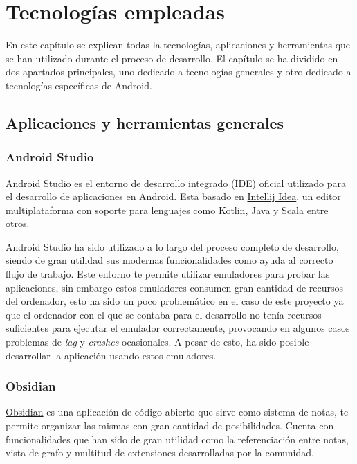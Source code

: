 \chapter{Tecnologías empleadas}
\label{cap:tecnologiasEmpleadas}
En este capítulo se explican todas la tecnologías, aplicaciones y herramientas que se han utilizado durante el proceso de desarrollo. El capítulo se ha dividido en dos apartados principales, uno dedicado a tecnologías generales y otro dedicado a tecnologías específicas de Android.

\section{Aplicaciones y herramientas generales}
\hypertarget{subsec:android_studio}{}
\subsection{Android Studio}
\href{https://developer.android.com/studio/intro}{Android Studio} es el entorno de desarrollo integrado (IDE) oficial utilizado para el desarrollo de aplicaciones en Android. Esta basado en \href{https://www.jetbrains.com/idea}{Intellij Idea}, un editor multiplataforma con soporte para lenguajes como \hyperlink{subsec:kotlin}{Kotlin}, \href{https://www.java.com}{Java} y \href{https://www.scala-lang.org}{Scala} entre otros. 

Android Studio ha sido utilizado a lo largo del proceso completo de desarrollo, siendo de gran utilidad sus modernas funcionalidades como ayuda al correcto flujo de trabajo. Este entorno te permite utilizar emuladores para probar las aplicaciones, sin embargo estos emuladores consumen gran cantidad de recursos del ordenador, esto ha sido un poco problemático en el caso de este proyecto ya que el ordenador con el que se contaba para el desarrollo no tenía recursos suficientes para ejecutar el emulador correctamente, provocando en algunos casos problemas de \textit{lag} y \textit{crashes} ocasionales. A pesar de esto, ha sido posible desarrollar la aplicación usando estos emuladores.

\subsection{Obsidian}
\href{https://obsidian.md/}{Obsidian} es una aplicación de código abierto que sirve como sistema de notas, te permite organizar las mismas con gran cantidad de posibilidades. Cuenta con funcionalidades que han sido de gran utilidad como la referenciación entre notas, vista de grafo y multitud de extensiones desarrolladas por la comunidad.

